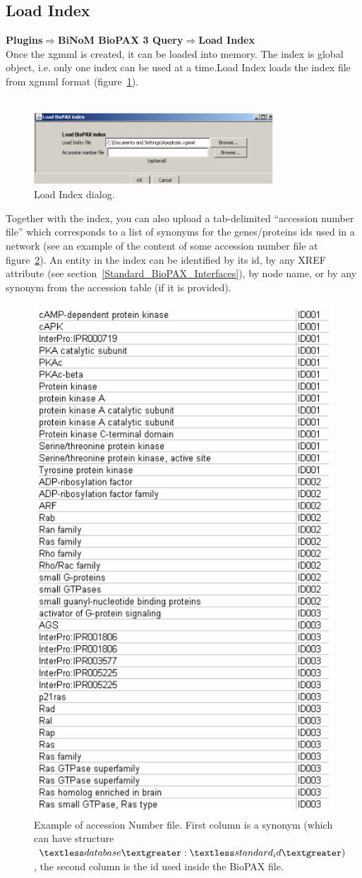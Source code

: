 \subsection{Load Index}
\textbf{Plugins$\Rightarrow$BiNoM BioPAX 3 Query$\Rightarrow$Load Index}\\
Once the xgmml is created, it can be loaded into memory. The index is global object, i.e. only one index can be used at a time.Load Index loads the index file from xgmml format (figure~\ref{Load_Index_Dialog}).\\\\
\begin{figure}[h]
\centering
\includegraphics[width=0.8\textwidth]{graphics/Load_Index_Dialog}
\caption{Load Index dialog.}
\label{Load_Index_Dialog}
\end{figure}
Together with the index, you can also upload a tab-delimited “accession number file” which corresponds to a list of synonyms for the genes/proteins ids used in a network (see an example of the content of some accession number file at figure~\ref{Accession_Number_File}). An entity in the index can be identified by its id, by any XREF attribute (see section~\ref{Standard_BioPAX_Interfaces}), by node name, or by any synonym from the accession table (if it is provided).
\begin{figure}[h]
\centering
\includegraphics[width=8 cm]{graphics/Accession_Number_File}
\caption{Example of accession Number file. First column is a synonym (which can have structure $\textless database\textgreater :\textless standard_id\textgreater)$, the second column is the id used inside the BioPAX file.}
\label{Accession_Number_File}
\end{figure}

